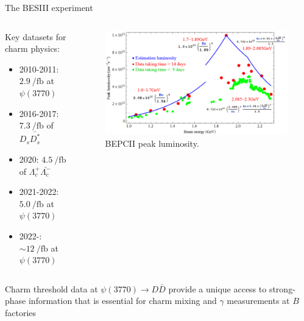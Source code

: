 \documentclass{beamer}
\begin{document}
\begin{frame}{The BESIII experiment}
  \begin{columns}
    \begin{column}{0.5\textwidth}
      \vspace{0.0cm}
      {\large Key datasets for charm physics:}
      \begin{itemize}
      \item[\ding{217}]{2010-2011: $\SI{2.9}{\per\femto\barn}$ at $\psi(3770)$}
      \item{2016-2017: $\SI{7.3}{\per\femto\barn}$ of $D_s\bar{D_s^*}$}
      \item{2020: $\SI{4.5}{\per\femto\barn}$ of $\Lambda_c^+\bar{\Lambda_c^-}$}
      \item[\ding{217}]{2021-2022: $\SI{5.0}{\per\femto\barn}$ at $\psi(3770)$}
      \item[\ding{217}]{2022-: $\sim\SI{12}{\per\femto\barn}$ at $\psi(3770)$}
      \end{itemize}
    \end{column}
    \begin{column}{0.5\textwidth}
      \vspace{0.5cm}
      \begin{figure}
        \includegraphics[width=1.0\textwidth]{Figures/BEPCII_Luminosity.png}
        \caption*{BEPCII peak luminosity.}
      \end{figure}
    \end{column}
  \end{columns}
  \begin{block}{}
    Charm threshold data at $\psi(3770)\to D\bar{D}$ provide a unique access to strong-phase information that is essential for charm mixing and $\gamma$ measurements at $B$ factories
  \end{block}
\end{frame}
\end{document}
